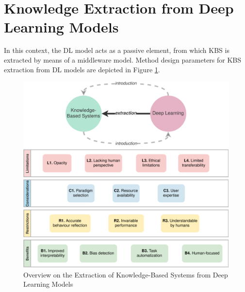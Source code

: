 \section{Knowledge Extraction from Deep Learning Models}\label{6_sec:kbs_extra_dl_method}
In this context, the DL model acts as a passive element, from which KBS is extracted by means of a middleware model. Method design parameters for KBS extraction from DL models are depicted in Figure \ref{fig:kbs_extra_dl_overview}.
\begin{figure}[t]
    \centering
    \includegraphics[width=\linewidth]{6_kbsextractiondl/figures/K_extraction_DL.eps}
    \caption{Overview on the Extraction of Knowledge-Based Systems from Deep Learning Models}
    \label{fig:kbs_extra_dl_overview}
\end{figure}

